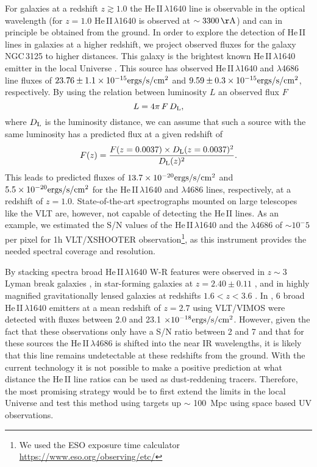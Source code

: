 \documentclass[linenumbers]{aastex63}
\begin{document}
For galaxies at a redshift $z\gtrsim1.0$ the He\,II\,$\lambda$1640 line is observable in the optical wavelength (for $z=1.0$ He\,II\,$\lambda$1640 is observed at $\sim 3300\,{\rm \AA}$) and can in principle be obtained from the ground. 
In order to explore the detection of He\,II lines in galaxies at a higher redshift, we project observed fluxes  for the galaxy NGC\,3125 to higher distances. This galaxy is the brightest known He\,II\,$\lambda$1640 emitter in the local Universe \citep{chandar_ngc_2004}.  
This source has observed He\,II\,$\lambda$1640 and $\lambda$4686 line fluxes of $23.76\pm1.1 \times 10^{-15}{\rm ergs/s/cm^2}$ and $9.59\pm0.3 \times 10^{-15}{\rm ergs/s/cm^2}$, respectively. 
By using the relation between luminosity $L$ an observed flux $F$ 
\begin{equation}
    L = 4\pi\,F\,D_{\rm L},
\end{equation}
where $D_{\rm L}$ is the luminosity distance, we can assume that such a source with the same luminosity has a predicted flux at a given redshift of
\begin{equation}
    F(z) = \frac{F(z=0.0037) \times D_{\rm L}(z=0.0037)^2}{D_{\rm L}(z)^2}.
\end{equation}
This leads to predicted fluxes of $13.7 \times 10^{-20}{\rm ergs/s/cm^2}$ and $5.5 \times 10^{-20}{\rm ergs/s/cm^2}$ for the He\,II\,$\lambda$1640 and $\lambda$4686 lines, respectively, at a redshift of $z=1.0$. 
State-of-the-art spectrographs mounted on large telescopes like the VLT are, however, not capable of detecting the He\,II lines. 
As an example, we estimated the S/N values of the He\,II\,$\lambda$1640 and the $\lambda$4686 of $\sim10^-5$ per pixel for 1h VLT/XSHOOTER observation\footnote{We used the ESO exposure time calculator \url{https://www.eso.org/observing/etc/}}, as this instrument provides the needed spectral coverage and resolution. 

By stacking spectra broad He\,II\,$\lambda$1640 W-R features were observed in $z\sim3$ Lyman break galaxies \citep[$N\sim 1000$;][]{shapley_rest-frame_2003}, in star-forming galaxies at $z = 2.40\pm0.11$ \citep[$N\sim 30$; ][]{steidel_reconciling_2016}, and in highly magnified gravitationally lensed galaxies at redshifts
$1.6 < z < 3.6$ \citep[$N\sim 14$; ][]{rigby_magellan_2018}. 
In \citet{saxena_properties_2020}, 6 broad He\,II\,$\lambda$1640 emitters at a mean redshift of $z=2.7$ using VLT/VIMOS were detected with fluxes between 2.0 and 23.1 $\times 10^{-18}{\rm ergs/s/cm^2}$. 
However, given the fact that these observations only have a S/N ratio between 2 and 7 and that for these sources the He\,II\,$\lambda$4686 is shifted into the near IR wavelengths, it is likely that this line remains undetectable at these redshifts from the ground. With the current technology it is not possible to make a positive prediction at what distance the He\,II line ratios can be used as dust-reddening tracers. Therefore, the most promising strategy would be to first extend the limits in the local Universe and test this method using  targets up $\sim$ 100~Mpc using space based UV observations.
\end{document}
